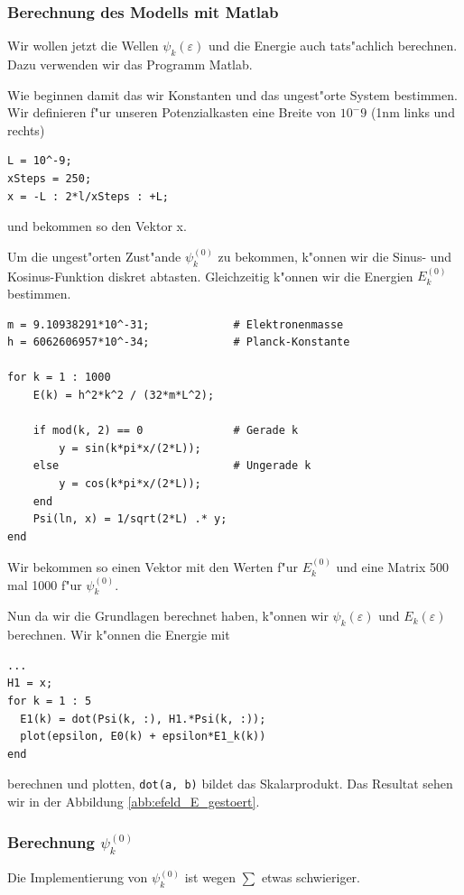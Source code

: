 \begin{refsection}
\subsubsection{Berechnung des Modells mit Matlab}

Wir wollen jetzt die Wellen $\psi_k(\varepsilon)$ und die Energie auch tats"achlich berechnen.
Dazu verwenden wir das Programm Matlab.

Wie beginnen damit das wir Konstanten und das ungest"orte System bestimmen.
Wir definieren f"ur unseren Potenzialkasten eine Breite von $10^-9$ (1nm links und rechts)
\begin{lstlisting}[style=Matlab]
L = 10^-9;
xSteps = 250;
x = -L : 2*l/xSteps : +L;
\end{lstlisting}
und bekommen so den Vektor x.

Um die ungest"orten Zust"ande $\psi_k^{(0)}$ zu bekommen, k"onnen wir die Sinus- und Kosinus-Funktion diskret abtasten.
Gleichzeitig k"onnen wir die Energien $E_k^{(0)}$ bestimmen.
\begin{lstlisting}[style=Matlab]
m = 9.10938291*10^-31;             # Elektronenmasse
h = 6062606957*10^-34;             # Planck-Konstante

for k = 1 : 1000
    E(k) = h^2*k^2 / (32*m*L^2);
    
    if mod(k, 2) == 0              # Gerade k
        y = sin(k*pi*x/(2*L));
    else                           # Ungerade k
        y = cos(k*pi*x/(2*L));
    end
    Psi(ln, x) = 1/sqrt(2*L) .* y;
end
\end{lstlisting}
Wir bekommen so einen Vektor mit den Werten f"ur $E_k^{(0)}$
und eine Matrix 500 mal 1000 f"ur $\psi_k^{(0)}$.

Nun da wir die Grundlagen berechnet haben, k"onnen wir $\psi_k(\varepsilon)$ und $E_k(\varepsilon)$ berechnen.
Wir k"onnen die Energie mit
\begin{lstlisting}[style=Matlab]
...
H1 = x;
for k = 1 : 5
  E1(k) = dot(Psi(k, :), H1.*Psi(k, :));
  plot(epsilon, E0(k) + epsilon*E1_k(k))
end
\end{lstlisting}
berechnen und plotten, \verb|dot(a, b)| bildet das Skalarprodukt.
Das Resultat sehen wir in der Abbildung \ref{abb:efeld_E_gestoert}.

\subsubsection{Berechnung $\psi_k^{(0)}$} %

Die Implementierung von $\psi_k^{(0)}$ ist wegen $\sum$ etwas schwieriger.


\end{refsection}
